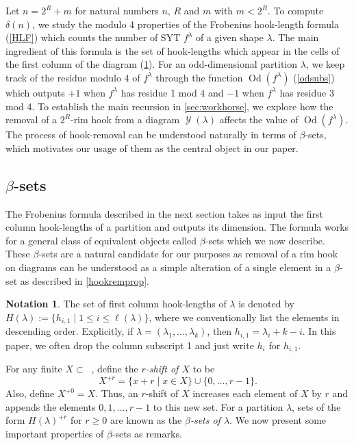 \documentclass[12pt]{amsart}
\theoremstyle{definition}
\newtheorem{notation}[theorem]{Notation}
\numberwithin{equation}{section}
\DeclareMathOperator{\sh}{\mathcal{Y}}
\DeclareMathOperator{\N}{\mathbb{Z}_{\geq 0}}
\newcommand{\la}{\lambda}
\DeclareMathOperator{\Od}{Od}
\begin{document}
Let $n = 2^R + m$ for natural numbers $n$, $R$ and $m$ with $m < 2^R$.
To compute $\delta(n)$, we study the modulo 4 properties of the Frobenius hook-length formula (\cref{HLF}) which counts the number of SYT $f^\la$ of a given shape $\la$. The main ingredient of this formula is the set of hook-lengths which appear in the cells of the first column of the diagram (\cref{notn:first-column}). For an odd-dimensional partition $\la$, we keep track of the residue modulo 4 of $f^\la$ through the function $\Od(f^\la)$ (\cref{odsubs}) which outputs $+1$ when $f^\la$ has residue 1 mod 4 and $-1$ when $f^\la$ has residue 3 mod 4.
To establish the main recursion in \cref{sec:workhorse}, we explore how the removal of a $2^R$-rim hook from a diagram $\sh(\lambda)$ affects the value of $\Od(f^\lambda)$. The process of hook-removal can be understood naturally in terms of $\beta$-sets, which motivates our usage of them as the central object in our paper.



\subsection{\texorpdfstring{$\beta$}{beta}-sets}
The Frobenius formula described in the next section takes as input the first column hook-lengths of a partition and outputs its dimension. The formula works for a general class of equivalent objects called $\beta$-sets which we now describe. These $\beta$-sets are a natural candidate for our purposes as removal of a rim hook on diagrams can be understood as a simple alteration of a single element in a $\beta$-set as described in \cref{hookremprop}.
\begin{notation}\label{notn:first-column}
    The set of first column hook-lengths of $\lambda$ is denoted by $H(\lambda) := \{h_{i, 1}\mid 1\leq i \leq \ell(\lambda)\}$,
where we conventionally list the elements in descending order.  Explicitly, if $\lambda = (\lambda_1, \ldots, \lambda_k)$, then $h_{i,1} = \lambda_i + k - i$. In this paper, we often drop the column subscript 1 and just write $h_i$ for $h_{i,1}$. 
\end{notation}
For any finite $X\subset \N$, define the \textit{$r$-shift of $X$} to be \[X^{+r} = \{x + r\mid x\in X\} \cup \{0, \ldots, r-1\}.\] Also, define $X^{+0} = X$. Thus, an $r$-shift of $X$ increases each element of $X$ by $r$ and appends the elements $0,1,\ldots, r-1$ to this new set. For a partition $\lambda$, sets of the form $H(\lambda)^{+r}$ for $r\geq 0$ are known as the \textit{$\beta$-sets of $\lambda$}. We now present some important properties of $\beta$-sets as remarks.
\end{document}
